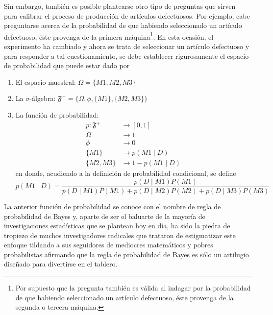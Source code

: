 \documentclass[10pt,openright]{book}\usepackage[]{graphicx}\usepackage[]{color}
\begin{document}
\begin{Eje}
Sin embargo, también es posible plantearse otro tipo de preguntas que sirven para calibrar el proceso de producción de artículos defectuosos. Por ejemplo, cabe preguntarse acerca de la probabilidad de que habiendo seleccionado un artículo defectuoso, éste provenga de la primera máquina\footnote{Por supuesto que la pregunta también es válida al indagar por la probabilidad de que habiendo seleccionado un artículo defectuoso, éste provenga de la segunda o tercera máquina.}. En esta ocasión, el experimento ha cambiado y ahora se trata de seleccionar un artículo defectuoso y para responder a tal cuestionamiento, se debe establecer rigurosamente el espacio de probabilidad que puede estar dado por
\begin{enumerate}
  \item El espacio muestral: $\Omega=\{M1, M2, M3 \}$
  \item La $\sigma$-álgebra: $\mathfrak{F}^+=\{\Omega, \phi, \{M1\}, \{M2,M3\}\}$
  \item La función de probabilidad:
  \begin{align*}
  p: \mathfrak{F}^+ &\longrightarrow [0,1]\\
     \Omega &\longrightarrow 1\\
     \phi &\longrightarrow 0\\
     \{M1\}&\longrightarrow p(M1 \mid D)\\
     \{M2,M3\}&\longrightarrow 1-p(M1 \mid D)
  \end{align*}
  en donde, acudiendo a la definición de probabilidad condicional, se define
  \begin{equation*}
  p(M1 \mid D)=\frac{p(D \mid M1)P(M1)}{p(D \mid M1)P(M1)+p(D \mid M2)P(M2)+p(D \mid M3)P(M3)}
  \end{equation*}
\end{enumerate}

La anterior función de probabilidad se conoce con el nombre de regla de probabilidad de Bayes y, aparte de ser el baluarte de la mayoría de investigaciones estadísticas que se plantean hoy en día, ha sido la piedra de tropiezo de muchos investigadores radicales que trataron de estigmatizar este enfoque tildando a sus seguidores de mediocres matemáticos y pobres probabilistas afirmando que la regla de probabilidad de Bayes es sólo un artilugio diseñado para divertirse en el tablero.


\end{Eje}
\end{document}
